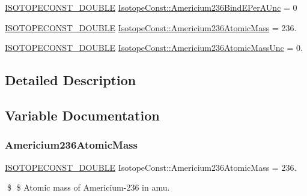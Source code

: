 \begin{DoxyCompactItemize}
\mbox{\hyperlink{group___isotope_const-_macros_ga8f45a7272ce02c0b4c65c44636ed719a}{I\+S\+O\+T\+O\+P\+E\+C\+O\+N\+S\+T\+\_\+\+D\+O\+U\+B\+LE}} \mbox{\hyperlink{group___isotope_const-_americium-_am236_gad966840d541309f6f096e829040db169}{Isotope\+Const\+::\+Americium236\+Bind\+E\+Per\+A\+Unc}} = 0
\item 
\mbox{\hyperlink{group___isotope_const-_macros_ga8f45a7272ce02c0b4c65c44636ed719a}{I\+S\+O\+T\+O\+P\+E\+C\+O\+N\+S\+T\+\_\+\+D\+O\+U\+B\+LE}} \mbox{\hyperlink{group___isotope_const-_americium-_am236_ga81c7f78b78a530d0e8ddb674d7c8725d}{Isotope\+Const\+::\+Americium236\+Atomic\+Mass}} = 236.
\item 
\mbox{\hyperlink{group___isotope_const-_macros_ga8f45a7272ce02c0b4c65c44636ed719a}{I\+S\+O\+T\+O\+P\+E\+C\+O\+N\+S\+T\+\_\+\+D\+O\+U\+B\+LE}} \mbox{\hyperlink{group___isotope_const-_americium-_am236_gaa5cc7afe8c2a2f4ac84e0ba33d6acbf5}{Isotope\+Const\+::\+Americium236\+Atomic\+Mass\+Unc}} = 0.
\end{DoxyCompactItemize}


\subsection{Detailed Description}


\subsection{Variable Documentation}
\mbox{\label{group___isotope_const-_americium-_am236_ga81c7f78b78a530d0e8ddb674d7c8725d}} 
\subsubsection{\texorpdfstring{Americium236\+Atomic\+Mass}{Americium236AtomicMass}}
{\footnotesize\ttfamily \mbox{\hyperlink{group___isotope_const-_macros_ga8f45a7272ce02c0b4c65c44636ed719a}{I\+S\+O\+T\+O\+P\+E\+C\+O\+N\+S\+T\+\_\+\+D\+O\+U\+B\+LE}} Isotope\+Const\+::\+Americium236\+Atomic\+Mass = 236.}

\$ \$ Atomic mass of Americium-\/236 in amu. \mbox{\label{group___isotope_const-_americium-_am236_gaa5cc7afe8c2a2f4ac84e0ba33d6acbf5}} 

